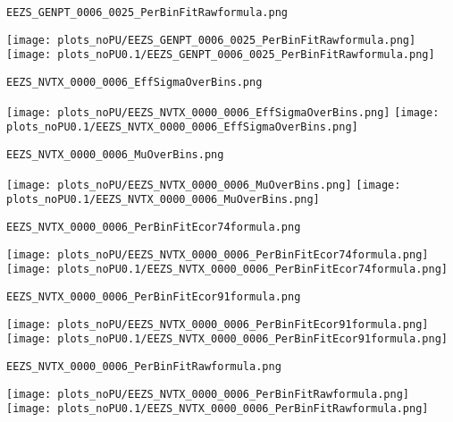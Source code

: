 \begin{frame}[fragile]
\begin{verbatim}
EEZS_GENPT_0006_0025_PerBinFitRawformula.png
\end{verbatim}
\texttt{[image: plots\_noPU/EEZS\_GENPT\_0006\_0025\_PerBinFitRawformula.png]}
\texttt{[image: plots\_noPU0.1/EEZS\_GENPT\_0006\_0025\_PerBinFitRawformula.png]}
\end{frame}
\begin{frame}[fragile]
\begin{verbatim}
EEZS_NVTX_0000_0006_EffSigmaOverBins.png
\end{verbatim}
\texttt{[image: plots\_noPU/EEZS\_NVTX\_0000\_0006\_EffSigmaOverBins.png]}
\texttt{[image: plots\_noPU0.1/EEZS\_NVTX\_0000\_0006\_EffSigmaOverBins.png]}
\end{frame}
\begin{frame}[fragile]
\begin{verbatim}
EEZS_NVTX_0000_0006_MuOverBins.png
\end{verbatim}
\texttt{[image: plots\_noPU/EEZS\_NVTX\_0000\_0006\_MuOverBins.png]}
\texttt{[image: plots\_noPU0.1/EEZS\_NVTX\_0000\_0006\_MuOverBins.png]}
\end{frame}
\begin{frame}[fragile]
\begin{verbatim}
EEZS_NVTX_0000_0006_PerBinFitEcor74formula.png
\end{verbatim}
\texttt{[image: plots\_noPU/EEZS\_NVTX\_0000\_0006\_PerBinFitEcor74formula.png]}
\texttt{[image: plots\_noPU0.1/EEZS\_NVTX\_0000\_0006\_PerBinFitEcor74formula.png]}
\end{frame}
\begin{frame}[fragile]
\begin{verbatim}
EEZS_NVTX_0000_0006_PerBinFitEcor91formula.png
\end{verbatim}
\texttt{[image: plots\_noPU/EEZS\_NVTX\_0000\_0006\_PerBinFitEcor91formula.png]}
\texttt{[image: plots\_noPU0.1/EEZS\_NVTX\_0000\_0006\_PerBinFitEcor91formula.png]}
\end{frame}
\begin{frame}[fragile]
\begin{verbatim}
EEZS_NVTX_0000_0006_PerBinFitRawformula.png
\end{verbatim}
\texttt{[image: plots\_noPU/EEZS\_NVTX\_0000\_0006\_PerBinFitRawformula.png]}
\texttt{[image: plots\_noPU0.1/EEZS\_NVTX\_0000\_0006\_PerBinFitRawformula.png]}
\end{frame}
